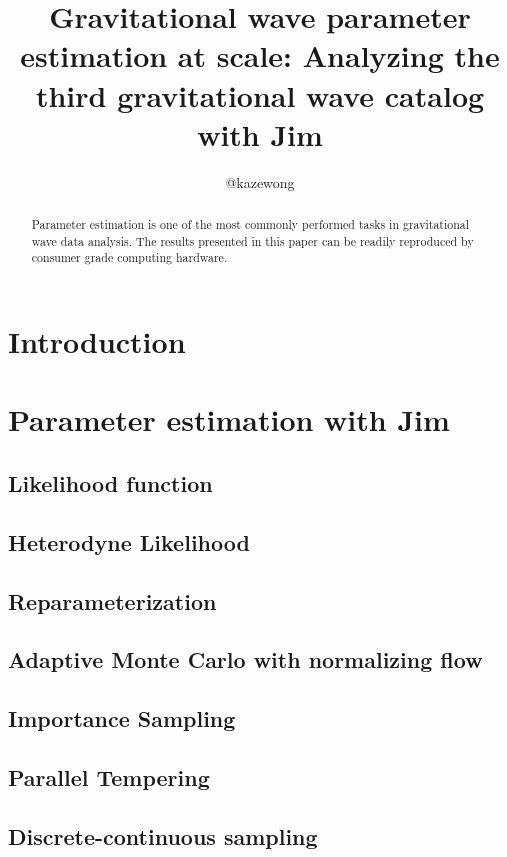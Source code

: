 \documentclass[twocolumn]{aastex631}
\begin{document}
\title{Gravitational wave parameter estimation at scale: Analyzing the third gravitational wave catalog with Jim}

\author{@kazewong}

\begin{abstract}
Parameter estimation is one of the most commonly performed tasks in gravitational wave data analysis.
The results presented in this paper can be readily reproduced by consumer grade computing hardware.
\end{abstract}

\section{Introduction}
\label{sec:intro}

\section{Parameter estimation with Jim}

\subsection{Likelihood function}

\subsection{Heterodyne Likelihood}

\subsection{Reparameterization}

\subsection{Adaptive Monte Carlo with normalizing flow}

\subsection{Importance Sampling}

\subsection{Parallel Tempering}

\subsection{Discrete-continuous sampling}
\end{document}
